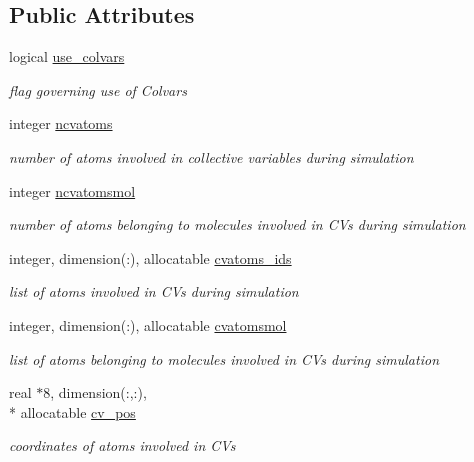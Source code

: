 \subsection*{Public Attributes}
\begin{DoxyCompactItemize}
\item 
logical \hyperlink{classcolvars_ae0f77ac6f6f4c0af1a1f09458e30c145}{use\-\_\-colvars}
\begin{DoxyCompactList}\small\item\em flag governing use of Colvars \end{DoxyCompactList}\item 
integer \hyperlink{classcolvars_ac61dbb2d19dcefc1fbe755db1f35b688}{ncvatoms}
\begin{DoxyCompactList}\small\item\em number of atoms involved in collective variables during simulation \end{DoxyCompactList}\item 
integer \hyperlink{classcolvars_add268966bff91c6c344e0c05452249ae}{ncvatomsmol}
\begin{DoxyCompactList}\small\item\em number of atoms belonging to molecules involved in C\-Vs during simulation \end{DoxyCompactList}\item 
integer, dimension(\-:), allocatable \hyperlink{classcolvars_a0ced678acae8973d2d446efd19dbbd9f}{cvatoms\-\_\-ids}
\begin{DoxyCompactList}\small\item\em list of atoms involved in C\-Vs during simulation \end{DoxyCompactList}\item 
integer, dimension(\-:), allocatable \hyperlink{classcolvars_a47f5647f261368e31a172ea3f2f629af}{cvatomsmol}
\begin{DoxyCompactList}\small\item\em list of atoms belonging to molecules involved in C\-Vs during simulation \end{DoxyCompactList}\item 
real $\ast$8, dimension(\-:,\-:), \\*
allocatable \hyperlink{classcolvars_a5c87abb4eb394e48d2cbd47413dc8179}{cv\-\_\-pos}
\begin{DoxyCompactList}\small\item\em coordinates of atoms involved in C\-Vs \end{DoxyCompactList}\item 

\end{DoxyCompactItemize}
